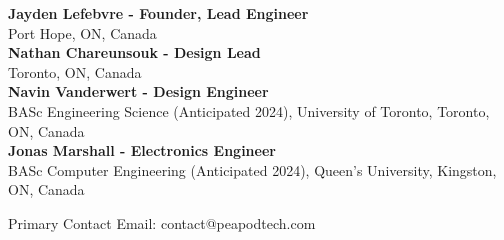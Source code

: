 \small{
    \textbf{Jayden Lefebvre - Founder, Lead Engineer}\\
    Port Hope, ON, Canada\\
    \vspace{.5cm}
    \textbf{Nathan Chareunsouk - Design Lead}\\Toronto, ON, Canada\\
    \vspace{.5cm}
    \textbf{Navin Vanderwert - Design Engineer}\\
    BASc Engineering Science (Anticipated 2024), University of Toronto, Toronto, ON, Canada\\
    \vspace{.5cm}
    \textbf{Jonas Marshall - Electronics Engineer}\\
    BASc Computer Engineering (Anticipated 2024), Queen's University, Kingston, ON, Canada\\
}

\vspace{1cm}

Primary Contact Email: contact@peapodtech.com